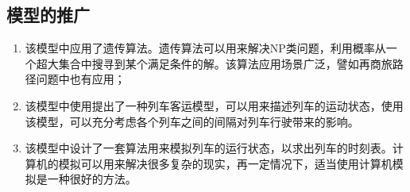 \subsection{模型的推广}

\begin{enumerate}
    \item 该模型中应用了遗传算法。遗传算法可以用来解决NP类问题，利用概率从一个超大集合中搜寻到某个满足条件的解。该算法应用场景广泛，譬如再商旅路径问题中也有应用；
    \item 该模型中使用提出了一种列车客运模型，可以用来描述列车的运动状态，使用该模型，可以充分考虑各个列车之间的间隔对列车行驶带来的影响。
    \item 该模型中设计了一套算法用来模拟列车的运行状态，以求出列车的时刻表。计算机的模拟可以用来解决很多复杂的现实，再一定情况下，适当使用计算机模拟是一种很好的方法。
\end{enumerate}